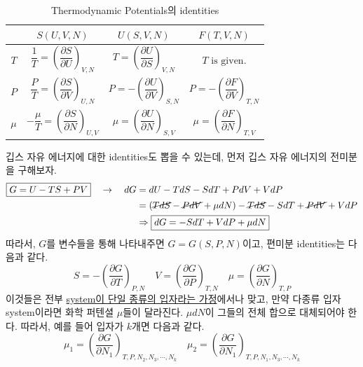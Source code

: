 \documentclass{article}
\begin{document}
\begin{table}[h]
\centering
\begin{tabular}{@{}cccc@{}}
\toprule
 & $S(U,V,N)$ & $U(S,V,N)$ & $F(T,V,N)$ \\ \midrule
$T$ &
  $\dfrac{1}{T} = \left( \dfrac{\partial S}{\partial U} \right)_{V, N}$ &
  $T = \left( \dfrac{\partial U}{\partial S} \right)_{V, N}$ &
  $T \text{ is given.}$ \\
$P$ &
  $\dfrac{P}{T} = \left( \dfrac{\partial S}{\partial V} \right)_{U, N}$ &
  $P = - \left( \dfrac{\partial U}{\partial V} \right)_{S, N}$ &
  $P = - \left( \dfrac{\partial F}{\partial V} \right)_{T, N}$ \\
$\mu$ &
  $- \dfrac{\mu}{T} = \left( \dfrac{\partial S}{\partial N} \right)_{U, V}$ &
  $\mu = \left( \dfrac{\partial U}{\partial N} \right)_{S, V}$ &
  $\mu = \left( \dfrac{\partial F}{\partial N} \right)_{T, V}$ \\ \bottomrule
\end{tabular}
\caption{Thermodynamic Potentials의 identities}
\label{tab:1}
\end{table}

\newpage

깁스 자유 에너지에 대한 identities도 뽑을 수 있는데, 먼저 깁스 자유 에너지의 전미분을 구해보자.
\begin{align}
    \boxed{G = U - TS + PV } \quad \rightarrow \quad dG &= dU - TdS- SdT + PdV + VdP\\ \nonumber
    &= (\cancel{TdS} - \cancel{PdV} + \mu dN) - \cancel{TdS} - SdT + \cancel{PdV} + VdP\\
    &\Rightarrow \boxed{ dG = -SdT + VdP + \mu dN}
\end{align}
따라서, $G$를 변수들을 통해 나타내주면 $G = G(S,P,N)$이고, 편미분 identities는 다음과 같다.
\begin{equation} \label{eq:1-14}
    \boxed{S = - \left( \frac{\partial G}{\partial T} \right)_{P,N}} \quad \boxed{V = \left( \frac{\partial G}{\partial P} \right)_{T,N}} \quad \boxed{\mu = \left( \frac{\partial G}{\partial N} \right)_{T,P}}
\end{equation}
이것들은 전부 \underline{system이 단일 종류의 입자라는 가정}에서나 맞고, 만약 다종류 입자 system이라면 화학 퍼텐셜 $\mu$들이 달라진다. $\mu d N$이 그들의 전체 합으로 대체되어야 한다. 따라서, 예를 들어 입자가 $k$개면 다음과 같다.
\begin{equation}
    \mu_1 = \left( \frac{\partial G}{\partial N_1} \right)_{T, P, N_2, N_3, \cdots, N_k} \quad \mu_2 = \left( \frac{\partial G}{\partial N_1} \right)_{T, P, N_1, N_3, \cdots, N_k}
\end{equation}
\end{document}
